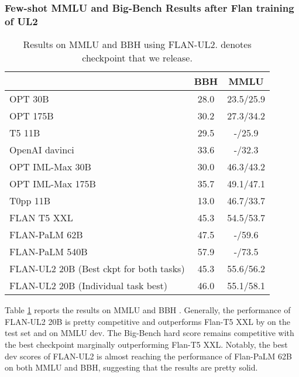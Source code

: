\documentclass[10pt]{article}
\begin{document}
\subsubsection{Few-shot MMLU and Big-Bench Results after Flan training of UL2}
\begin{table}[H]
    \centering
    \begin{tabular}{l|cc}
    \toprule
         &  BBH & MMLU \\
             \midrule
        OPT 30B & 28.0 & 23.5/25.9 \\
        OPT 175B & 30.2 & 27.3/34.2 \\
        T5 11B & 29.5 & -/25.9 \\
        OpenAI davinci & 33.6 & -/32.3 \\
        \midrule
        OPT IML-Max 30B & 30.0 & 46.3/43.2 \\ 
        OPT IML-Max 175B & 35.7 & 49.1/47.1 \\
        T0pp 11B & 13.0 & 46.7/33.7 \\
        FLAN T5 XXL & 45.3 & 54.5/53.7 \\
        FLAN-PaLM 62B & 47.5 & -/59.6 \\ 
        FLAN-PaLM 540B & 57.9 & -/73.5 \\
        \midrule
        FLAN-UL2 20B (Best ckpt for both tasks) & 45.3 & 55.6/56.2 \\
        FLAN-UL2 20B (Individual task best) &46.0  & 55.1/58.1\\
        \bottomrule
    \end{tabular}
    \caption{Results on MMLU and BBH using FLAN-UL2.  denotes checkpoint that we release.}
    \label{tab:flan_results}
\end{table}

Table \ref{tab:flan_results} reports the results on MMLU and BBH \citep{suzgun2022challenging}. Generally, the performance of FLAN-UL2 20B is pretty competitive and outperforms Flan-T5 XXL by  on the test set and  on MMLU dev. The Big-Bench hard score remains competitive with the best checkpoint marginally outperforming Flan-T5 XXL. Notably, the best dev scores of FLAN-UL2 is almost reaching the performance of Flan-PaLM 62B on both MMLU and BBH, suggesting that the results are pretty solid.
\end{document}
